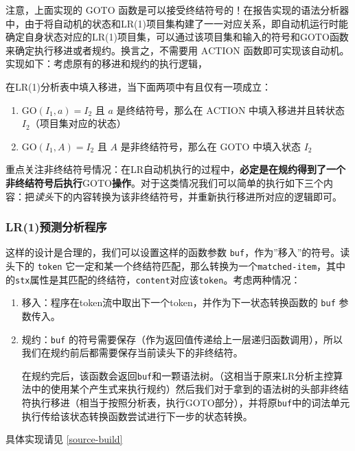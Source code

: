 \documentclass[lang=cn]{ctexart}
\begin{document}
{注意，上面实现的 $\mathrm{GOTO}$ 函数是可以接受终结符号的！在报告实现的语法分析器中，由于将自动机的状态和LR(1)项目集构建了一一对应关系，即自动机运行时能确定自身状态对应的LR(1)项目集，可以通过该项目集和输入的符号和$\mathrm{GOTO}$函数来确定执行移进或者规约。换言之，不需要用 $\mathrm{ACTION}$ 函数即可实现该自动机。实现如下：考虑原有的移进和规约的执行逻辑，
	
在LR(1)分析表中填入移进，当下面两项中有且仅有一项成立：

\begin{enumerate}
	\item $\mathrm{GO}(I_1, a) = I_2$ 且 $a$ 是终结符号，那么在 $\mathrm{ACTION}$ 中填入移进并且转状态 $I_2$（项目集对应的状态）
	\item $\mathrm{GO}(I_1, A) = I_2$ 且 $A$ 是非终结符号，那么在 $\mathrm{GOTO}$ 中填入状态 $I_2$
\end{enumerate}

重点关注非终结符号情况：在LR自动机执行的过程中，\textbf{必定是在规约得到了一个非终结符号后执行}$\mathrm{GOTO}$\textbf{操作}。对于这类情况我们可以简单的执行如下三个内容：把\textit{读头}下的内容转换为该非终结符号，并重新执行移进所对应的逻辑即可。

\subsubsection{LR(1)预测分析程序}

这样的设计是合理的，我们可以设置这样的函数参数 \lstinline|buf|，作为''移入''的符号。读头下的 \lstinline|token| 它一定和某一个终结符匹配，那么转换为一个\lstinline|matched-item|，其中的\lstinline|stx|属性是其匹配的终结符，\lstinline|content|对应该\lstinline|token|。考虑两种情况：
\begin{enumerate}
	\item 移入：程序在token流中取出下一个token，并作为下一状态转换函数的 \lstinline|buf| 参数传入。
	\item 规约：\lstinline|buf| 的符号需要保存（作为返回值传递给上一层递归函数调用），所以我们在规约前后都需要保存当前读头下的非终结符。
	
	在规约完后，该函数会返回\lstinline|buf|和一颗语法树。（这相当于原来LR分析主控算法中的使用某个产生式来执行规约）然后我们对于拿到的语法树的头部非终结符执行移进（相当于按照分析表，执行GOTO部分），并将原\lstinline|buf|中的词法单元执行传给该状态转换函数尝试进行下一步的状态转换。
\end{enumerate}

具体实现请见 \ref{source-build}

}
\end{document}
